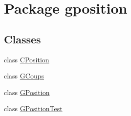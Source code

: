 \hypertarget{namespacegposition}{\section{Package gposition}
\label{namespacegposition}
}
\subsection*{Classes}
\begin{DoxyCompactItemize}
\item 
class \hyperlink{classgposition_1_1_c_position}{C\-Position}
\item 
class \hyperlink{classgposition_1_1_g_coups}{G\-Coups}
\item 
class \hyperlink{classgposition_1_1_g_position}{G\-Position}
\item 
class \hyperlink{classgposition_1_1_g_position_test}{G\-Position\-Test}
\end{DoxyCompactItemize}
